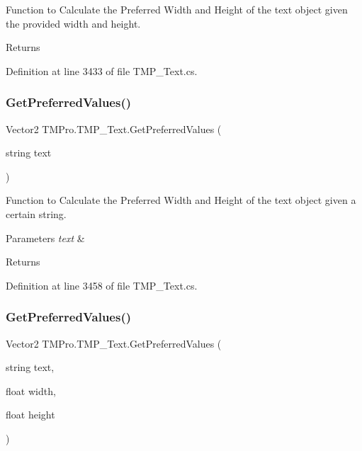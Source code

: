 Function to Calculate the Preferred Width and Height of the text object given the provided width and height. 

\begin{DoxyReturn}{Returns}

\end{DoxyReturn}


Definition at line 3433 of file T\+M\+P\+\_\+\+Text.\+cs.

\mbox{\label{class_t_m_pro_1_1_t_m_p___text_a039a0f623414b9972e2e123a81ddc003}} 
\subsubsection{\texorpdfstring{GetPreferredValues()}{GetPreferredValues()}\hspace{0.1cm}{\footnotesize\ttfamily [3/4]}}
{\footnotesize\ttfamily Vector2 T\+M\+Pro.\+T\+M\+P\+\_\+\+Text.\+Get\+Preferred\+Values (\begin{DoxyParamCaption}\item[{string}]{text }\end{DoxyParamCaption})}



Function to Calculate the Preferred Width and Height of the text object given a certain string. 


\begin{DoxyParams}{Parameters}
{\em text} & \\
\hline
\end{DoxyParams}
\begin{DoxyReturn}{Returns}

\end{DoxyReturn}


Definition at line 3458 of file T\+M\+P\+\_\+\+Text.\+cs.

\mbox{\label{class_t_m_pro_1_1_t_m_p___text_a5bad2f9a6312f25cc94280a90b61f864}} 
\subsubsection{\texorpdfstring{GetPreferredValues()}{GetPreferredValues()}\hspace{0.1cm}{\footnotesize\ttfamily [4/4]}}
{\footnotesize\ttfamily Vector2 T\+M\+Pro.\+T\+M\+P\+\_\+\+Text.\+Get\+Preferred\+Values (\begin{DoxyParamCaption}\item[{string}]{text,  }\item[{float}]{width,  }\item[{float}]{height }\end{DoxyParamCaption})}



